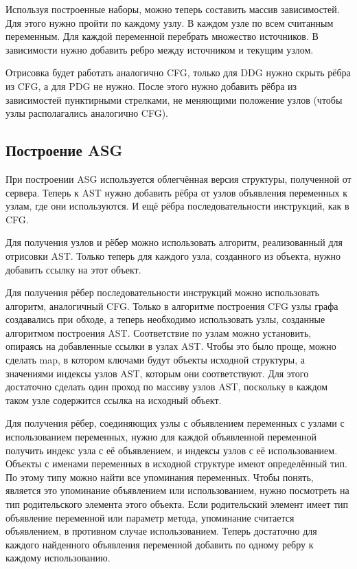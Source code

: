 Используя построенные наборы, можно теперь составить массив зависимостей. Для этого нужно пройти по каждому узлу. В каждом узле по всем считанным переменным. Для каждой переменной перебрать множество источников. В зависимости нужно добавить ребро между источником и текущим узлом.

Отрисовка будет работать аналогично CFG, только для DDG нужно скрыть рёбра из CFG, а для PDG не нужно. После этого нужно добавить рёбра из зависимостей пунктирными стрелками, не меняющими положение узлов (чтобы узлы располагались аналогично CFG).

\subsection{Построение ASG} \label{ch2:subsec-title-abbr}

При построении ASG используется облегчённая версия структуры, полученной от сервера. Теперь к AST нужно добавить рёбра от узлов объявления переменных к узлам, где они используются. И ещё рёбра последовательности инструкций, как в CFG.

Для получения узлов и рёбер можно использовать алгоритм, реализованный для отрисовки AST. Только теперь для каждого узла, созданного из объекта, нужно добавить ссылку на этот объект.

Для получения рёбер последовательности инструкций можно использовать алгоритм, аналогичный CFG. Только в алгоритме построения CFG узлы графа создавались при обходе, а теперь необходимо использовать узлы, созданные алгоритмом построения AST. Соответствие по узлам можно установить, опираясь на добавленные ссылки в узлах AST. Чтобы это было проще, можно сделать map, в котором ключами будут объекты исходной структуры, а значениями индексы узлов AST, которым они соответствуют. Для этого достаточно сделать один проход по массиву узлов AST, поскольку в каждом таком узле содержится ссылка на исходный объект.

Для получения рёбер, соединяющих узлы с объявлением переменных с узлами с использованием переменных, нужно для каждой объявленной переменной получить индекс узла с её объявлением, и индексы узлов с её использованием. Объекты с именами переменных в исходной структуре имеют определённый тип. По этому типу можно найти все упоминания переменных. Чтобы понять, является это упоминание объявлением или использованием, нужно посмотреть на тип родительского элемента этого объекта. Если родительский элемент имеет тип объявление переменной или параметр метода, упоминание считается объявлением, в противном случае использованием. Теперь достаточно для каждого найденного объявления переменной добавить по одному ребру к каждому использованию.

